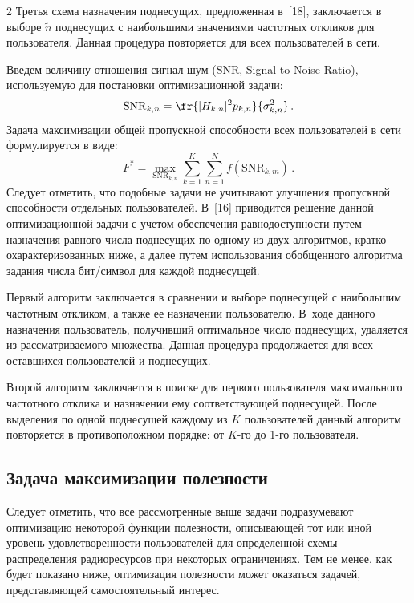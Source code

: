 \begin{multicols}{2}
  Третья схема назначения поднесущих, предложенная в~[18], заключается в выборе 
$\tilde{n}$ поднесущих с наибольшими значениями частотных откликов для пользователя. 
Данная процедура повторяется для всех пользователей в сети.
  
  Введем величину отношения сигнал-шум (SNR, Signal-to-Noise Ratio), используемую 
для постановки оптимизационной задачи:
$$
\mathrm{SNR}_{k,n}=\fr{\vert H_{k,n}\vert^2 
p_{k,n}}{\sigma_{k,n}^2}\,.
$$ 
Задача максимизации общей пропускной способности всех 
пользователей в сети формулируется в виде:
$$
F^*=\max\limits_{\mathrm{SNR}_{k,n}} 
\sum\limits_{k=1}^K \sum\limits_{n=1}^N f(\mathrm{SNR}_{k,m})\,.
$$
Следует отметить, что подобные 
задачи не учитывают улучшения пропускной способности отдельных пользователей. 
В~[16] приводится решение данной оптимизационной задачи с учетом обеспечения 
рав\-но\-до\-ступ\-ности путем назначения равного чис\-ла поднесущих по одному из двух 
алгоритмов, кратко охарактеризованных ниже, а далее путем использования обобщенного 
алгоритма задания чис\-ла бит/символ для каждой поднесущей.
  
  Первый алгоритм заключается в сравнении и выборе поднесущей с наибольшим 
частотным откликом, а также ее назначении пользователю. В~ходе данного назначения 
пользователь, получивший оптимальное число поднесущих, удаляется из 
рассматриваемого множества. Данная процедура продолжается для всех оставшихся 
пользователей и поднесущих. 

Второй алгоритм заключается в поиске для первого 
пользователя максимального частотного отклика и назначении ему соответствующей 
поднесущей. После выделения по одной поднесущей каждому из $K$ пользователей 
данный алгоритм повторяется в противоположном порядке: от $K$-го до 1-го 
пользователя.

\subsection{Задача максимизации полезности}

  Следует отметить, что все рассмотренные выше задачи подразумевают оптимизацию 
некоторой функции полезности, описывающей тот или иной уровень удовлетворенности 
пользователей для определенной схемы распределения радиоресурсов при некоторых 
ограничениях. Тем не менее, как будет показано ниже, оптимизация полезности может 
оказаться задачей, представляющей самостоятельный интерес.
  

\end{multicols}
